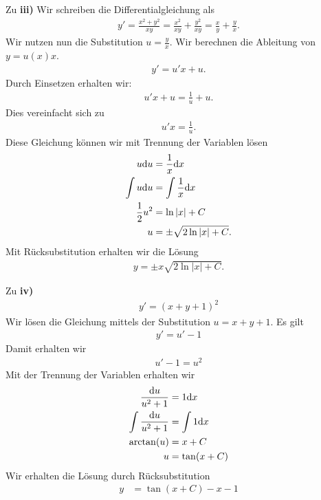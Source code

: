{\begin{itemize}
\noindent Zu \textbf{iii)}
Wir schreiben die Differentialgleichung als
\begin{align*}
y' = \frac{x^2+y^2}{xy} = \frac{x^2}{xy} + \frac{y^2}{xy} = \frac{x}{y} +\frac{y}{x}.
\end{align*}
Wir nutzen nun die Substitution $u = \frac{y}{x}$. 
Wir berechnen die Ableitung von $y = u(x)x$.
\begin{align*}
y' = u'x+u.
\end{align*}
Durch Einsetzen erhalten wir:
\begin{align*}
u'x+u = \frac{1}{u}+u.
\end{align*}
Dies vereinfacht sich zu 
\begin{align*}
u'x= \frac{1}{u}.
\end{align*}
Diese Gleichung können wir mit Trennung der Variablen lösen
\begin{align*}
u \mathrm{d} u &= \frac{1}{x} \mathrm{d} x\\
\int u \mathrm{d} u &= \int \frac{1}{x} \mathrm{d} x \\
\frac{1}{2}u^2 &= \ln|x| + C \\
u &= \pm\sqrt{2\ln|x| +C}.
\end{align*}
Mit Rücksubstitution erhalten wir die Lösung
\begin{align*}
y = \pm x\sqrt{2\ln|x| +C}.
\end{align*}

\noindent Zu \textbf{iv)}
\begin{align*}
y'= (x+y+1)^2
\end{align*}
Wir lösen die Gleichung mittels der Substitution $u = x + y +1$.
Es gilt 
\begin{align*}
y' = u'-1 
\end{align*}
Damit erhalten wir 
\begin{align*}
u' - 1 = u^2
\end{align*}
Mit der Trennung der Variablen erhalten wir
\begin{align*}
\frac{\mathrm{d} u}{u^2 +1} &= 1\mathrm{d} x\\
\int\frac{\mathrm{d} u}{u^2 +1} &=\int 1\mathrm{d} x\\
\arctan(u) &= x + C \\
u &= \tan(x + C)
\end{align*}
Wir erhalten die Lösung durch Rücksubstitution
\begin{align*}
y &= \tan(x + C) -x-1
\end{align*}


\end{itemize}
}



